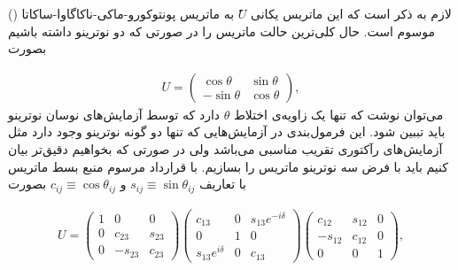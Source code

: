 \documentclass[a4paper]{book}
\begin{document}
لازم به ذکر است که این ماتریس یکانی {\footnotesize$ََU$} به ماتریس پونتوکورو-ماکی-ناکاگاوا-ساکاتا () موسوم است. حال کلی‌ترین حالت ماتریس  را در صورتی که دو نوترینو داشته باشیم بصورت
\par
\vspace{-0.5cm}
{\footnotesize\begin{align}
	U=\begin{pmatrix}
		\cos\theta&\sin\theta\\
		-\sin\theta&\cos\theta
	\end{pmatrix},
	\label{eq:PMNS-2}
\end{align}}
می‌توان نوشت که تنها یک زاویه‌ی اختلاط {\footnotesize$\theta$} دارد که توسط آزمایش‌های نوسان نوترینو باید تببین شود. این فرمول‌بندی در آزمایش‌هایی که تنها دو گونه نوترینو وجود دارد مثل آزمایش‌های رآکتوری تقریب مناسبی می‌باشد ولی در صورتی که بخواهیم دقیق‌تر بیان کنیم باید با فرض سه نوترینو ماتریس  را بسازیم. با قرارداد مرسوم منبع \cite{PhysRevLett.53.1802} بسط ماتریس  با تعاریف {\footnotesize$s_{ij} \equiv \sin \theta_{ij}$} و {\footnotesize$c_{ij} \equiv \cos  \theta_{ij}$} بصورت
\par
\vspace{-0.5cm}
{\footnotesize\begin{align}
	U = 
	\begin{pmatrix}
		1&0&0\\0&c_{23}&s_{23}\\0&-s_{23}&c_{23}
	\end{pmatrix}
	\begin{pmatrix}
		c_{13}&0&s_{13}e^{-i\delta}\\0&1&0\\s_{13}e^{i \delta}&0&c_{13}
	\end{pmatrix}
	\begin{pmatrix}
		c_{12}& s_{12} & 0\\-s_{12} & c_{12} & 0 \\ 0 & 0 & 1
	\end{pmatrix},
	\label{eq:PMNS-3}
\end{align}}
\end{document}
